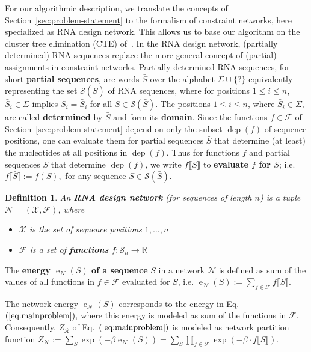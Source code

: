 \documentclass{bioinfo}
\newtheorem{definition}[theorem]{Definition}
\newcommand{\network}{\mathcal{N}}
\newcommand{\val}{\bar S} %
\newcommand{\dep}{\operatorname{dep}}
\newcommand{\energy}[1]{\operatorname{e}_{#1}}
\newcommand{\partfun}[1]{Z_{#1}}
\newcommand{\real}{\mathbb{R}}
\newcommand{\F}{\mathcal{F}}
\newcommand{\R}{\mathcal{R}}
\renewcommand{\S}{\mathcal{S}}
\newcommand{\X}{\mathcal{X}}
\newcommand{\Def}[1]{{\bfseries #1}}
\newcommand{\evalfor}[2]{#1\llbracket{}#2\rrbracket{}}
\begin{document}
For our algorithmic description, we translate the concepts of
Section~\ref{sec:problem-statement} to the formalism of constraint networks, here
specialized as RNA design network. This allows us to base our
algorithm on the cluster tree elimination (CTE) of~\citet{Dechter2013}.
%
In the RNA design network, (partially determined) RNA sequences
replace the more general concept of (partial) assignments in
constraint networks. Partially determined RNA sequences, for short
\Def{partial sequences}, are words $\val$ over the alphabet
$\Sigma\cup\{?\}$ equivalently representing the set ${\mathcal S}(\val)$
of RNA sequences, where for positions $1\leq i\leq n$,
$\val_i\in\Sigma$ implies $S_i=\val_i$ for all $S\in{\mathcal
  S}(\val)$. The positions $1\leq i\leq n$, where $\val_i\in\Sigma$,
are called \Def{determined} by $\val$ and form its \Def{domain}.
%
Since the functions $f\in\F$ of Section~\ref{sec:problem-statement}
depend on only the subset $\dep(f)$ of sequence positions, one can
evaluate them for partial sequences $\val$ that determine (at least)
the nucleotides at all positions in $\dep(f)$. Thus for functions $f$
and partial sequences $\val$ that determine $\dep(f)$, we write
$\evalfor{f}{\val}$ to \Def{evaluate $f$ for $\val$}; i.e.{}
$\evalfor{f}{\val} := f(S),$ for any sequence
$S\in{\mathcal S}(\val)$.

\begin{definition}
An \Def{RNA design network} (for sequences of length $n$) is a tuple $\network=(\X,\F)$, where\vspace{-6pt}
\begin{itemize}
\item $\X$ is the set of sequence positions $1,\dots,n$
\item $\F$ is a set of \Def{functions} $f:\S_n\to\real$
\end{itemize}
\end{definition}

%
The \Def{energy $\energy{\network}(S)$ of a sequence} $S$ in a network
$\network$ is defined as sum of the values of all functions in
$f\in\F$ evaluated for $S$, i.e.
$\energy{\network}(S) := \sum_{f\in\F} \evalfor{f}{S}.$

The network energy $\energy{\network}(S)$ corresponds to the energy in
Eq.~$(\ref{eq:mainproblem}),$ where this energy is modeled as sum of
the functions in $\F$. Consequently, $\partfun{\R}$ of
Eq.~$(\ref{eq:mainproblem})$ is modeled as network partition function
$\partfun{\network} := \sum_{S}\exp(-\beta\energy{\network}(S)) = \sum_{S}\prod_{f\in\F} \exp( -\beta\cdot
\evalfor{f}{S} ).$
\end{document}
